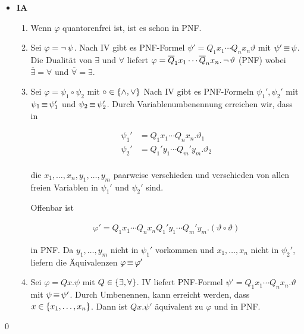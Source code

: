 \begin{itemize}
  \item \textbf{IA}
  \begin{enumerate}
    \item Wenn $\varphi$ quantorenfrei ist, ist es schon in PNF.
    \item Sei $\varphi = \operatorname{\neg}\psi$. Nach IV gibt es PNF-Formel $\psi' = Q_1x_1\cdots Q_nx_n \vartheta$ mit $\psi' \operatorname{\equiv} \psi$. Die Dualität von $\exists$ und $\forall$ liefert
      $\varphi = \overline{Q}_1x_1 \cdots \overline{Q}_nx_n.\operatorname{\neg}\vartheta$ (PNF)
    wobei $\overline{\exists}=\forall$ und $\overline{\forall}=\exists$.
    
    \item Sei $\varphi = \psi_1 \circ \psi_2$ mit $\circ\in\left\{\operatorname{\wedge},\operatorname{\vee}\right\}$
    Nach IV gibt es PNF-Formeln $\psi_1', \psi_2'$ mit $\psi_1 \operatorname{\equiv} \psi_1'$
    und $\psi_2 \operatorname{\equiv} \psi_2'$. Durch Variablenumbenennung erreichen wir, dass in
    
    \begin{align}
      \psi_1' &= Q_1x_1 \cdots Q_nx_n. \vartheta_1 \\
      \psi_2' &= Q_1'y_1 \cdots Q_m'y_m. \vartheta_2 \\
    \end{align}
    
    die $x_1,\dots,x_n, y_1,\dots,y_m$ paarweise verschieden und verschieden von allen freien Variablen in $\psi_1'$ und $\psi_2'$ sind.
    
    Offenbar ist
    
    \begin{align}
      \varphi' = Q_1x_1\cdots Q_nx_n Q_1'y_1 \cdots Q_m'y_m .(\vartheta\circ\vartheta)
    \end{align}
    
    in PNF. Da $y_1,\dots,y_m$ nicht in $\psi_1'$ vorkommen und $x_1,\dots,x_n$ nicht in $\psi_2'$, liefern die Äquivalenzen $\varphi \operatorname{\equiv} \varphi'$
    
    \item Sei $\varphi = Q x.\psi$ mit $Q \in\left\{\exists, \forall\right\}$.
    IV liefert PNF-Formel $\psi'=Q_1x_1\cdots Q_nx_n.\vartheta$
    mit $\psi \operatorname{\equiv} \psi'$. Durch Umbenennen, kann erreicht werden,
    dass $x \in \left\{x_1,\dots,x_n\right\}$. Dann ist $Q x.\psi'$ äquivalent zu $\varphi$ und in PNF.
  \end{enumerate}
\end{itemize}
\qed



